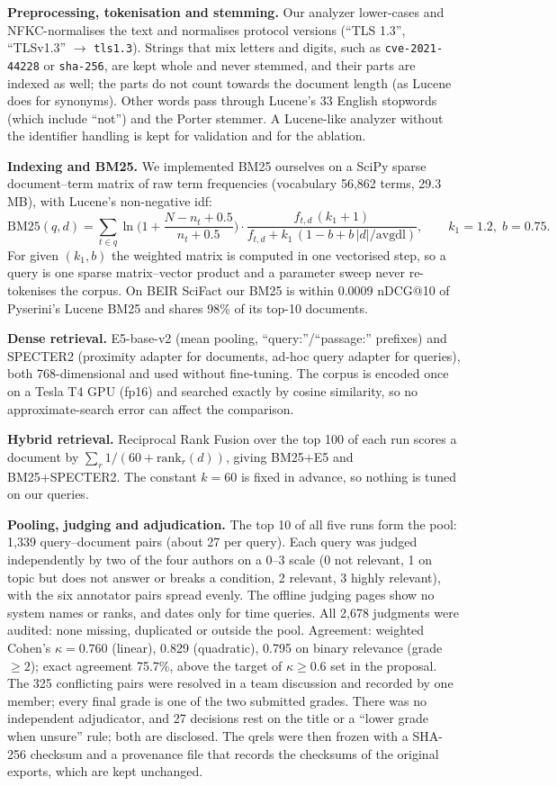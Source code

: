 \documentclass[10pt,a4paper]{article}
\begin{document}
\textbf{Preprocessing, tokenisation and stemming.} Our analyzer lower-cases and NFKC-normalises the text and
normalises protocol versions (``TLS 1.3'', ``TLSv1.3'' $\to$ \texttt{tls1.3}). Strings that mix letters and
digits, such as \texttt{cve-2021-44228} or \texttt{sha-256}, are kept whole and never stemmed, and their parts
are indexed as well; the parts do not count towards the document length (as Lucene does for synonyms). Other
words pass through Lucene's 33 English stopwords (which include ``not'') and the Porter stemmer. A Lucene-like
analyzer without the identifier handling is kept for validation and for the ablation.

\textbf{Indexing and BM25.} We implemented BM25 ourselves on a SciPy sparse document--term matrix of raw term
frequencies (vocabulary 56{,}862 terms, 29.3\,MB), with Lucene's non-negative idf:
\[
\textstyle \mathrm{BM25}(q,d)=\sum_{t\in q}\ln\!\Big(1+\frac{N-n_t+0.5}{n_t+0.5}\Big)\cdot
\frac{f_{t,d}\,(k_1+1)}{f_{t,d}+k_1\,(1-b+b\,|d|/\mathrm{avgdl})},\qquad k_1=1.2,\; b=0.75 .
\]
For given $(k_1,b)$ the weighted matrix is computed in one vectorised step, so a query is one sparse
matrix--vector product and a parameter sweep never re-tokenises the corpus. On BEIR SciFact our BM25 is
within 0.0009 nDCG@10 of Pyserini's Lucene BM25 and shares 98\% of its top-10 documents.

\textbf{Dense retrieval.} E5-base-v2 (mean pooling, ``query:''/``passage:'' prefixes) and SPECTER2 (proximity
adapter for documents, ad-hoc query adapter for queries), both 768-dimensional and used without fine-tuning.
The corpus is encoded once on a Tesla T4 GPU (fp16) and searched exactly by cosine similarity, so no
approximate-search error can affect the comparison.

\textbf{Hybrid retrieval.} Reciprocal Rank Fusion over the top 100 of each run scores a document by
$\sum_r 1/(60+\mathrm{rank}_r(d))$, giving BM25+E5 and BM25+SPECTER2. The constant $k=60$ is fixed in advance, so nothing is tuned on our queries.

\textbf{Pooling, judging and adjudication.} The top 10 of all five runs form the pool: 1{,}339 query--document
pairs (about 27 per query). Each query was judged independently by two of the four authors on a 0--3 scale
(0 not relevant, 1 on topic but does not answer or breaks a condition, 2 relevant, 3 highly relevant), with the
six annotator pairs spread evenly. The offline judging pages show no system names or ranks, and dates only for
time queries. All 2{,}678 judgments were audited: none missing, duplicated or outside the pool. Agreement:
weighted Cohen's $\kappa=0.760$ (linear), 0.829 (quadratic), 0.795 on binary relevance (grade $\ge 2$); exact
agreement 75.7\%, above the target of $\kappa\ge0.6$ set in the proposal. The 325 conflicting pairs were resolved in a
team discussion and recorded by one member; every final grade is one of the two submitted grades. There was no
independent adjudicator, and 27 decisions rest on the title or a ``lower grade when unsure'' rule; both are
disclosed. The qrels were then frozen with a SHA-256 checksum and a provenance file that records the checksums
of the original exports, which are kept unchanged.
\end{document}
